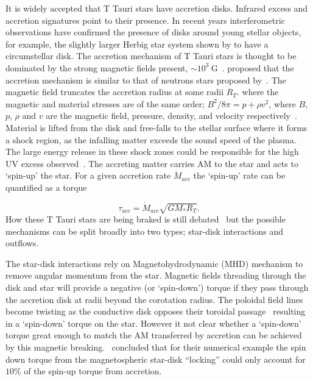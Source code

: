 \documentclass[fleqn,usenatbib]{mnras}
\begin{document}
It is widely accepted that T Tauri stars have accretion disks. Infrared excess and accretion signatures point to their presence. In recent years interferometric observations have confirmed the presence of disks around young stellar objects, for example, the slightly larger Herbig star system shown by \cite{2012ApJ...752...11K} to have a circumstellar disk. The accretion mechanism of T Tauri stars is thought to be dominated by the strong magnetic fields present, $\sim 10^{3}~\textrm{G}$~\citep{2012MNRAS.426.2901K}. \citet{1991ApJ...370L..39K} proposed that the accretion mechanism is similar to that of neutrons stars proposed by~\citet{1977ApJ...217..578G}. The magnetic field truncates the accretion radius at some radii $R_T$. where the magnetic and material stresses are of the same order; $B^2/8\pi = p + \rho v^2$, where $B$, $p$, $\rho$ and $v$ are the magnetic field, pressure, density, and velocity respectively~\citep{Romanova:2002hc}. Material is lifted from the disk and free-falls to the stellar surface where it forms a shock region, as the infalling matter exceeds the sound speed of the plasma. The large energy release in these shock zones could be responsible for the high UV excess observed~\citep{2009A&A...508.1117Z}. The accreting matter carries AM to the star and acts to `spin-up' the star. For a given accretion rate $\dot{M}_{acc}$ the `spin-up' rate can be quantified as a torque~\citep{2005ApJ...632L.135M}

\begin{equation}
    \tau_{acc} = \dot{M}_{acc}\sqrt{GM_{\ast}R_{T}}.
    \label{eq:accretion_torque}
\end{equation}
How these T Tauri stars are being braked is still debated~\citep{Hartmann:2016gu} but the possible mechanisms can be split broadly into two types; star-disk interactions and outflows. 


The star-disk interactions rely on Magnetohydrodynamic (MHD) mechanism to remove angular momentum from the star. Magnetic fields threading through the disk and star will provide a negative (or `spin-down') torque if they pass through the accretion disk at radii beyond the corotation radius. The poloidal field lines become twisting as the conductive disk opposes their toroidal passage~\citep{Uzdensky:2002dg} resulting in a `spin-down' torque on the star.  However it not clear whether a `spin-down' torque great enough to match the AM transferred by accretion can be achieved by this magnetic breaking.~\citet{2009A&A...508.1117Z} concluded that for their numerical example the spin down torque from the magnetospheric star-disk ``locking'' could only account for $10\%$ of the spin-up torque from accretion.
\end{document}
